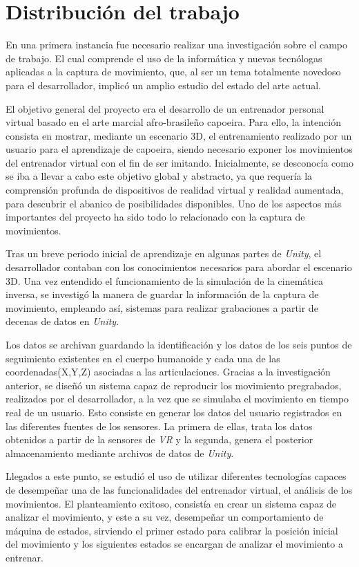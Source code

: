 \chapter{Distribución del trabajo}
En una primera instancia fue necesario realizar una investigación sobre el campo de trabajo. El cual comprende el uso de la informática y nuevas tecnólogas aplicadas a la captura de movimiento, que, al ser un tema totalmente novedoso para el desarrollador, implicó un amplio estudio del estado del arte actual.  

El objetivo general del proyecto era el desarrollo de un entrenador personal virtual basado en el arte marcial afro-brasileño capoeira. Para ello, la intención consista en mostrar, mediante un escenario 3D, el entrenamiento realizado por un usuario para el aprendizaje de capoeira, siendo necesario exponer los movimientos del entrenador virtual con el fin de ser imitando. Inicialmente, se desconocía como se iba a llevar a cabo este objetivo global y abstracto, ya que requería la comprensión profunda de dispositivos de realidad virtual y realidad aumentada, para descubrir el abanico de posibilidades disponibles. Uno de los aspectos más importantes del proyecto ha sido todo lo relacionado con la captura de movimientos. 

Tras un breve periodo inicial de aprendizaje en algunas partes de \textit{Unity}, el desarrollador contaban con los conocimientos necesarios para abordar el escenario 3D. Una vez entendido el funcionamiento de la simulación de la cinemática inversa, se investigó la manera de guardar la información de la captura de movimiento, empleando así, sistemas para realizar grabaciones a partir de decenas de datos en \textit{Unity}. 

Los datos se archivan guardando la identificación y los datos de los seis puntos de seguimiento existentes en el cuerpo humanoide y cada una de las coordenadas(X,Y,Z)  asociadas a las articulaciones. Gracias a la investigación anterior, se diseñó un sistema capaz de reproducir los movimiento pregrabados, realizados por el desarrollador, a la vez que se simulaba el movimiento en tiempo real de un usuario. Esto consiste en generar los datos del usuario registrados en las diferentes fuentes de los sensores. La primera de ellas, trata los datos obtenidos a partir de la sensores de \textit{VR} y la segunda, genera el posterior almacenamiento mediante archivos de datos de \textit{Unity}.

Llegados a este punto, se estudió el uso de utilizar diferentes tecnologías capaces de desempeñar una de las funcionalidades del entrenador virtual, el análisis de los movimientos. El planteamiento exitoso, consistía en crear un sistema capaz de analizar el movimiento, y este a su vez, desempeñar un comportamiento de máquina de estados, sirviendo el primer estado para calibrar la posición inicial del movimiento y los siguientes estados se encargan de analizar el movimiento a entrenar. 

